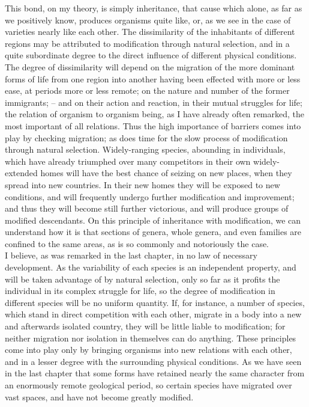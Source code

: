 \indent This bond, on my theory, is simply inheritance, that cause which alone, as far as we positively know, produces organisms quite like, or, as we see in the case of varieties nearly like each other. The dissimilarity of the inhabitants of different regions may be attributed to modification through natural selection, and in a quite subordinate degree to the direct influence of different physical conditions.  The degree of dissimilarity will depend on the migration of the more dominant forms of life from one region into another having been effected with more or less ease, at periods more or less remote; on the nature and number of the former immigrants; -- and on their action and reaction, in their mutual struggles for life; the relation of organism to organism being, as I have already often remarked, the most important of all relations. Thus the high importance of barriers comes into play by checking migration; as does time for the slow process of modification through natural selection.  Widely-ranging species, abounding in individuals, which have already triumphed over many competitors in their own widely-extended homes will have the best chance of seizing on new places, when they spread into new countries. In their new homes they will be exposed to new conditions, and will frequently undergo further modification and improvement; and thus they will become still further victorious, and will produce groups of modified descendants. On this principle of inheritance with modification, we can understand how it is that sections of genera, whole genera, and even families are confined to the same areas, as is so commonly and notoriously the case.~\\
\indent I believe, as was remarked in the last chapter, in no law of necessary development. As the variability of each species is an independent property, and will be taken advantage of by natural selection, only so far as it profits the individual in its complex struggle for life, so the degree of modification in different species will be no uniform quantity. If, for instance, a number of species, which stand in direct competition with each other, migrate in a body into a new and afterwards isolated country, they will be little liable to modification; for neither migration nor isolation in themselves can do anything. These principles come into play only by bringing organisms into new relations with each other, and in a lesser degree with the surrounding physical conditions. As we have seen in the last chapter that some forms have retained nearly the same character from an enormously remote geological period, so certain species have migrated over vast spaces, and have not become greatly modified.~\\
